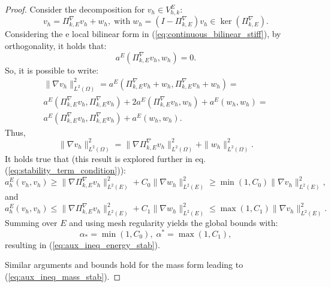 \documentclass{article}
\newcommand{\scalenergyproj}{\Pi^{\nabla}_{k,E}}
\newcommand{\localvespace}{V^E_{h,k}}
\newcommand{\lebesguespace}[1]{L^2(#1)}
\begin{document}
\begin{proof}
    Consider the decomposition for $v_h \in \localvespace$:
    \begin{equation}
    \nonumber
        v_h = \scalenergyproj v_h + w_h, \; \text{with} \; w_h = (I - \scalenergyproj)v_h \in \ker (\scalenergyproj).
    \end{equation}
    Considering the e local bilinear form in (\ref{eq:continuous_bilinear_stiff}), by orthogonality, it holds that:
    \begin{equation}
    \nonumber
        a^E(\scalenergyproj v_h, w_h) = 0.
    \end{equation}
    So, it is possible to write:
    \begin{equation}
    \nonumber
       \begin{split}
            \| \nabla v_h \|^2_{L^2(\Omega)} = a^E (\scalenergyproj v_h + w_h, \scalenergyproj v_h + w_h) = \\
            a^E(\scalenergyproj v_h, \scalenergyproj v_h) + 2 a^E(\scalenergyproj v_h, w_h) + a^E(w_h, w_h) = \\
            a^E(\scalenergyproj v_h, \scalenergyproj v_h) + a^E(w_h, w_h).
       \end{split}
    \end{equation}
    Thus,
    \begin{equation}
    \nonumber
        \| \nabla v_h \|^2_{L^2(\Omega)} = \| \nabla \scalenergyproj v_h \|^2_{L^2(\Omega)} + \| w_h \|^2_{L^2(\Omega)}.
    \end{equation}
    It holds true  that (this result is explored further in eq. (\ref{eq:stability_term_condition})):
    \begin{equation}
    \nonumber
        a^E_h(v_h, v_h) \geq \| \nabla \scalenergyproj v_h \|^2_{\lebesguespace{E}} + C_0 \| \nabla w_h \|^2_{\lebesguespace{E}} \geq \min (1, C_0) \| \nabla v_h \|^2_{\lebesguespace{E}},
    \end{equation}
    and
    \begin{equation}
    \nonumber
        a^E_h(v_h, v_h) \leq \| \nabla \scalenergyproj v_h \|^2_{\lebesguespace{E}} + C_1 \| \nabla w_h \|^2_{\lebesguespace{E}} \leq \max (1, C_1) \| \nabla v_h \|^2_{\lebesguespace{E}}.
    \end{equation}
    Summing over $E$ and using mesh regularity yields the global bounds with:
    \begin{equation}
    \nonumber
        \alpha_* = \min (1,C_0), \; \alpha^* = \max (1, C_1),
    \end{equation}
    resulting in (\ref{eq:aux_ineq_energy_stab}).

    Similar arguments and bounds hold for the mass form leading to (\ref{eq:aux_ineq_mass_stab}).
\end{proof}
\end{document}
